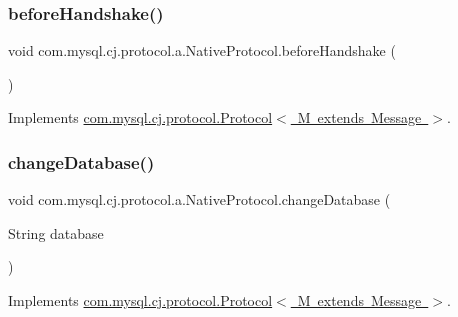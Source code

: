 \subsubsection{\texorpdfstring{before\+Handshake()}{beforeHandshake()}}
{\footnotesize\ttfamily void com.\+mysql.\+cj.\+protocol.\+a.\+Native\+Protocol.\+before\+Handshake (\begin{DoxyParamCaption}{ }\end{DoxyParamCaption})}



Implements \mbox{\hyperlink{interfacecom_1_1mysql_1_1cj_1_1protocol_1_1_protocol_ab775cf8ac0a9bec0df8c4a473c804ae8}{com.\+mysql.\+cj.\+protocol.\+Protocol$<$ M extends Message $>$}}.

\mbox{\label{classcom_1_1mysql_1_1cj_1_1protocol_1_1a_1_1_native_protocol_a565743e2d31afb5137925eb2c372d344}} 
\subsubsection{\texorpdfstring{change\+Database()}{changeDatabase()}}
{\footnotesize\ttfamily void com.\+mysql.\+cj.\+protocol.\+a.\+Native\+Protocol.\+change\+Database (\begin{DoxyParamCaption}\item[{String}]{database }\end{DoxyParamCaption})}



Implements \mbox{\hyperlink{interfacecom_1_1mysql_1_1cj_1_1protocol_1_1_protocol_a02558c9b17a492adb2e5b9cb0fb82778}{com.\+mysql.\+cj.\+protocol.\+Protocol$<$ M extends Message $>$}}.

\mbox{\label{classcom_1_1mysql_1_1cj_1_1protocol_1_1a_1_1_native_protocol_a7f356b98ad856e135cfbdcae35d87009}} 

